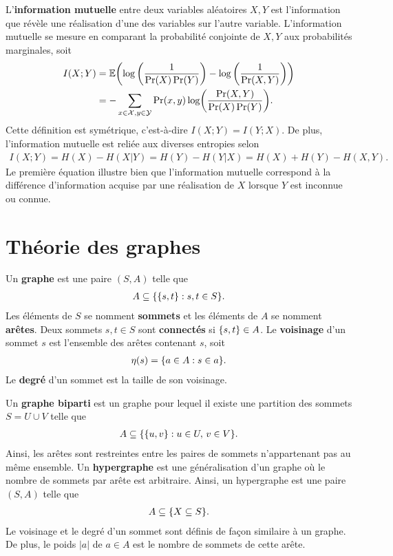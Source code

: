 L'\textbf{information mutuelle} entre deux variables aléatoires $X, Y$ est
l'information que révèle une réalisation d'une des variables sur l'autre variable.
L'information mutuelle se mesure en comparant la probabilité conjointe de $X, Y$
aux probabilités marginales, soit
\begin{align}
  I(X ; Y) 
  &= \mathbb E\qty(
    \log\qty(\frac{1}{\Pr(X)\Pr(Y)})
    -
    \log\qty(\frac{1}{\Pr(X, Y)})
  ) \notag \\
  &= -\sum_{x\in\mathcal X, y \in\mathcal Y}\Pr(x, y) \log(\frac{\Pr(X, Y)}{\Pr(X)\Pr(Y)}).
\end{align}
Cette définition est symétrique,
c'est-à-dire $I(X ; Y) = I(Y ; X)$.
De plus,
l'information mutuelle est reliée aux diverses entropies selon
\begin{align}
  I(X;Y)
  = H(X) - H(X | Y)
  = H(Y) - H(Y | X)
  = H(X) + H(Y) - H(X, Y).
\end{align}
Le première équation illustre bien que l'information mutuelle correspond à la différence
d'information acquise par une réalisation de $X$ lorsque $Y$ est inconnue ou connue.


\chapter{Théorie des graphes}
\label{chap:theo_graphe}

Un \textbf{graphe} est une paire $(S, A)$ telle que 
\begin{align}
  A \subseteq \qty{\qty{s, t} : s,t \in S}.
\end{align}
Les éléments de $S$ se nomment \textbf{sommets}
et les éléments de $A$ se nomment \textbf{arêtes}.
Deux sommets $s, t \in S$ sont \textbf{connectés} si $\qty{s, t} \in A$.
Le \textbf{voisinage} d'un sommet $s$ est l'ensemble des arêtes contenant $s$,
soit 
\begin{align}
  \eta(s) = \qty{a \in A : s \in a}.
\end{align}
Le \textbf{degré} d'un sommet est la taille de son voisinage.

Un \textbf{graphe biparti} est un graphe pour lequel il existe une 
partition des sommets $S = U \cup V$ telle que 
\begin{align}
  A \subseteq \qty{\qty{u, v} : u \in U,\, v \in V}.
\end{align}
Ainsi, les arêtes sont restreintes entre les paires de sommets n'appartenant pas
au même ensemble.
Un \textbf{hypergraphe} est une généralisation d'un graphe
où le nombre de sommets par arête est arbitraire.
Ainsi,
un hypergraphe est une paire $(S, A)$ telle que
\begin{align}
  A \subseteq \qty{X \subseteq S}.
\end{align}
Le voisinage et le degré d'un sommet sont définis de façon similaire à un graphe.
De plus, le poids $|a|$ de $a \in A$ est le nombre de sommets de cette arête.


